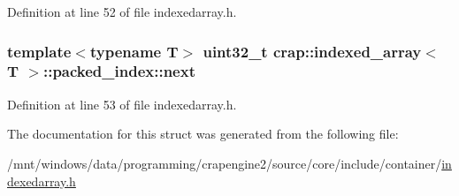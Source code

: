 Definition at line 52 of file indexedarray.\+h.

\hypertarget{structcrap_1_1indexed__array_1_1packed__index_a790171618ecc2fe9aa6b1b7526c43201}{}
\subsubsection[{next}]{\setlength{\rightskip}{0pt plus 5cm}template$<$typename T$>$ uint32\+\_\+t {\bf crap\+::indexed\+\_\+array}$<$ T $>$\+::packed\+\_\+index\+::next}\label{structcrap_1_1indexed__array_1_1packed__index_a790171618ecc2fe9aa6b1b7526c43201}


Definition at line 53 of file indexedarray.\+h.



The documentation for this struct was generated from the following file\+:\begin{DoxyCompactItemize}
\item 
/mnt/windows/data/programming/crapengine2/source/core/include/container/\hyperlink{indexedarray_8h}{indexedarray.\+h}\end{DoxyCompactItemize}
